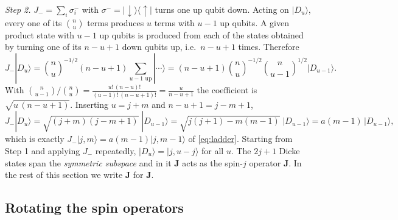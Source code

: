 \documentclass[11pt,a4paper]{article}
\newcommand{\vJ}{\bm{J}}
\newcommand{\up}{{\uparrow}}
\newcommand{\dn}{{\downarrow}}
\begin{document}
\emph{Step 2.} $J_- = \sum_i \sigma^-_i$ with $\sigma^- = |\dn\rangle\langle\up|$ turns one up qubit down. Acting on
$|D_u\rangle$, every one of its $\binom nu$ terms produces $u$ terms with $u-1$ up qubits. A given product state with
$u-1$ up qubits is produced from each of the states obtained by turning one of its $n-u+1$ down qubits up, i.e.\
$n-u+1$ times. Therefore
\begin{equation*}
  J_-|D_u\rangle = \binom nu^{-1/2}(n-u+1)\sum_{\text{$u-1$ up}}|\cdots\rangle
  = (n-u+1)\binom nu^{-1/2}\binom{n}{u-1}^{1/2}|D_{u-1}\rangle .
\end{equation*}
With $\binom{n}{u-1}\big/\binom nu = \frac{u!\,(n-u)!}{(u-1)!\,(n-u+1)!} = \frac{u}{n-u+1}$ the coefficient is
$\sqrt{u\,(n-u+1)}$. Inserting $u = j+m$ and $n-u+1 = j-m+1$,
\begin{equation*}
  J_-|D_u\rangle = \sqrt{(j+m)(j-m+1)}\;|D_{u-1}\rangle = \sqrt{j(j+1)-m(m-1)}\;|D_{u-1}\rangle = a(m-1)\,|D_{u-1}\rangle ,
\end{equation*}
which is exactly $J_-|j,m\rangle = a(m-1)|j,m-1\rangle$ of \eqref{eq:ladder}. Starting from Step 1 and applying $J_-$
repeatedly, $|D_u\rangle = |j,u-j\rangle$ for all $u$. The $2j+1$ Dicke states span the \emph{symmetric subspace} and in
it $\vJ$ acts as the spin-$j$ operator $\vJ$. In the rest of this section we write $\vJ$ for $\vJ$.

\subsection{Rotating the spin operators}\label{sec:rotation}
\end{document}

